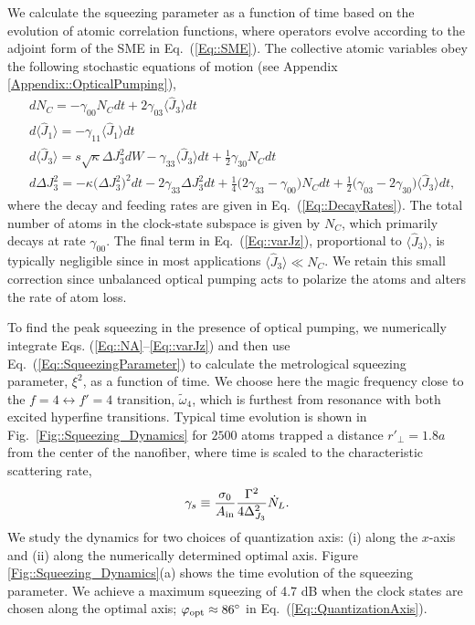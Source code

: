 \documentclass[preprint, aps,pra,onecolumn]{revtex4-1} %
\newcommand{\erf}[1]{Eq.~(\ref{#1})}
\newcommand{\frf}[1]{Fig.~\ref{#1}}
\newcommand{\expt}[1]{\langle{#1}\rangle}
\newcommand{\smallfrac}[2]{\mbox{$\frac{#1}{#2}$}}
\newcommand{\varz}{\Delta J_3^2}
\newcommand{\qangle}{\varphi}
\newcommand{\magic}[1]{\tilde{\omega}_{#1}}
\begin{document}
We calculate the squeezing parameter as a function of time based on the evolution of atomic correlation functions, where operators evolve according to the adjoint form of the SME in \erf{Eq::SME}.  The collective atomic variables obey the following stochastic equations of motion (see Appendix \ref{Appendix::OpticalPumping}),
\begin{subequations}\label{Eq::collectivedynamics}
	\begin{align} 
		&d N_C = -\gamma_{00} N_C dt + 2\gamma_{03} \expt{\hat{J}_3} dt \label{Eq::NA}\\
		&d \expt{\hat{J}_1}  = -\gamma_{11} \expt{\hat{J}_1} dt  \label{Eq::MeanSpinDecay} \\
		&d \expt{\hat{J}_3}  = s\sqrt{\kappa} \varz dW -\gamma_{33} \expt{\hat{J}_3}dt + \smallfrac{1}{2}\gamma_{30} N_C dt   \\
		&d \varz  = - \kappa \big(\varz\big)^2 dt- 2 \gamma_{33} \varz dt + \smallfrac{1}{4} \big( 2\gamma_{33}-\gamma_{00} \big) N_C dt + \smallfrac{1}{2} \big( \gamma_{03} - 2 \gamma_{30} \big) \expt{\hat{J}_3} dt,   \label{Eq::varJz} 
	\end{align}
\end{subequations}
where the decay and feeding rates are given in \erf{Eq::DecayRates}.
The total number of atoms in the clock-state subspace is given by $N_C$, which primarily decays at rate $\gamma_{00}$. 
The final term in \erf{Eq::varJz}, proportional to $\expt{\hat{J}_3}$, is typically negligible since in most applications $\expt{\hat{J}_3} \ll N_C$.  
We retain this small correction since unbalanced optical pumping acts to polarize the atoms and alters the rate of atom loss.  

To find the peak squeezing in the presence of optical pumping, we numerically integrate Eqs. (\ref{Eq::NA}--\ref{Eq::varJz}) and then use \erf{Eq::SqueezingParameter} to calculate the metrological squeezing parameter, $\xi^2$, as a function of time. 
We choose here the magic frequency close to the $ f=4\leftrightarrow f'=4 $ transition, $ \magic{4} $, which is furthest from resonance with both excited hyperfine transitions. 
Typical time evolution is shown in \frf{Fig::Squeezing_Dynamics} for $2500$ atoms trapped a distance $r'\!_\perp=1.8a$ from the center of the nanofiber, where time is scaled to the characteristic scattering rate, 
\begin{align}\label{Eq::gamma_s}
\gamma_s \equiv \frac{\sigma_0}{A_{\rm in}}\frac{\Gamma^2}{4 \Delta_{J_3}^2} \dot{N}_L .
\end{align}  
We study the dynamics for two choices of quantization axis: (i) along the $x$-axis and (ii) along the numerically determined optimal axis.  Figure \ref{Fig::Squeezing_Dynamics}(a) shows the time evolution of the squeezing parameter.  We achieve a maximum squeezing of 4.7 dB when the clock states are chosen along the optimal axis; $\qangle_{\rm opt} \approx 86^\circ$ in \erf{Eq::QuantizationAxis}. 
\end{document}
